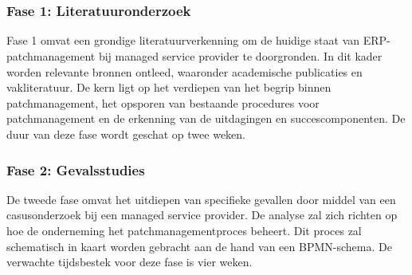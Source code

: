 
\chapter{}%
\label{ch:methodologie}


\subsection{Fase 1: Literatuuronderzoek}
Fase 1 omvat een grondige literatuurverkenning om de huidige staat van ERP-patchmanagement bij managed service provider te doorgronden. In dit kader worden relevante bronnen ontleed, waaronder academische publicaties en vakliteratuur. De kern ligt op het verdiepen van het begrip binnen patchmanagement, het opsporen van bestaande procedures voor patchmanagement en de erkenning van de uitdagingen en succescomponenten. De duur van deze fase wordt geschat op twee weken.
\subsection{Fase 2: Gevalsstudies}
De tweede fase omvat het uitdiepen van specifieke gevallen door middel van een casusonderzoek bij een managed service provider. De analyse zal zich richten op hoe de onderneming het patchmanagementproces beheert. Dit proces zal schematisch in kaart worden gebracht aan de hand van een BPMN-schema. De verwachte tijdsbestek voor deze fase is vier weken.
